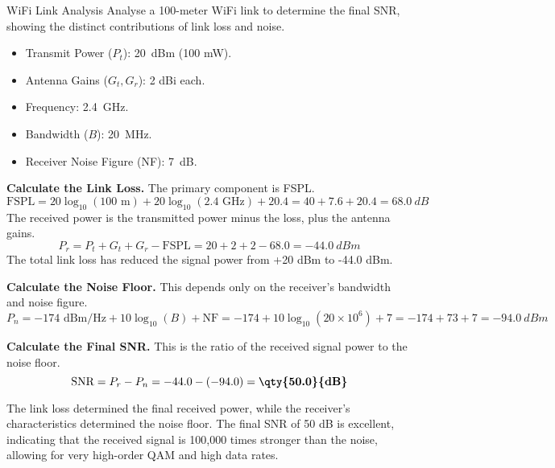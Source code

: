 \begin{workedexample}{WiFi Link Analysis}
     Analyse a 100-meter WiFi link to determine the final SNR, showing the distinct contributions of link loss and noise.
    \begin{itemize}
        \item Transmit Power ($P_t$): \qty{20}{dBm} (100 mW).
        \item Antenna Gains ($G_t, G_r$): 2 dBi each.
        \item Frequency: \qty{2.4}{GHz}.
        \item Bandwidth ($B$): \qty{20}{MHz}.
        \item Receiver Noise Figure (NF): \qty{7}{dB}.
    \end{itemize}
    \begin{derivationsteps}
        \step \textbf{Calculate the Link Loss.} The primary component is FSPL.
        \[ \text{FSPL} = 20\log_{10}(100 \text{ m}) + 20\log_{10}(2.4 \text{ GHz}) + 20.4 = 40 + 7.6 + 20.4 = \qty{68.0}{dB} \]
        The received power is the transmitted power minus the loss, plus the antenna gains.
        \[ P_r = P_t + G_t + G_r - \text{FSPL} = 20 + 2 + 2 - 68.0 = \qty{-44.0}{dBm} \]
        The total link loss has reduced the signal power from +20 dBm to -44.0 dBm.
        
        \step \textbf{Calculate the Noise Floor.} This depends only on the receiver's bandwidth and noise figure.
        \[ P_n = -174 \text{ dBm/Hz} + 10\log_{10}(B) + \text{NF} = -174 + 10\log_{10}(20 \times 10^6) + 7 = -174 + 73 + 7 = \qty{-94.0}{dBm} \]
        
        \step \textbf{Calculate the Final SNR.} This is the ratio of the received signal power to the noise floor.
        \[ \text{SNR} = P_r - P_n = -44.0 - (-94.0) = \textbf{\qty{50.0}{dB}} \]
    \end{derivationsteps}
     The link loss determined the final received power, while the receiver's characteristics determined the noise floor. The final SNR of 50 dB is excellent, indicating that the received signal is 100,000 times stronger than the noise, allowing for very high-order QAM and high data rates.
\end{workedexample}


